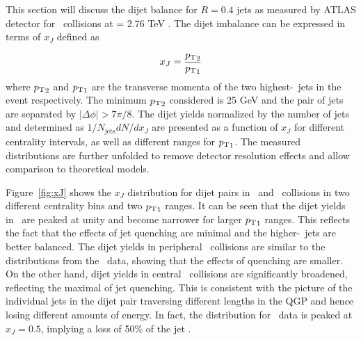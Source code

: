 
This section will discuss the dijet balance for $R = 0.4$ jets as measured by ATLAS detector for \pbpb\ collisions at \sqrtsnn = 2.76 TeV \cite{Aaboud:2017eww}.
The dijet imbalance can be expressed in terms of $x_J$ defined as

\begin{align}
x_J =  \frac{\mbox{$p_{\mathrm{T}}$}_2}{\mbox{$p_{\mathrm{T}}$}_1}
\end{align}
where $\mbox{$p_{\mathrm{T}}$}_2$ and $\mbox{$p_{\mathrm{T}}$}_1$ are the transverse momenta of the two highest-\pt\ jets in the event respectively.
The minimum $\mbox{$p_{\mathrm{T}}$}_2$ considered is 25 GeV and the pair of jets are separated by $|\Delta\phi| > 7\pi/8$.
The dijet yields normalized by the number of jets and determined as $1/N_\mathrm{jets} dN/dx_J$ are presented as a function of $x_J$ for different centrality intervals, as well as different ranges for $\mbox{$p_{\mathrm{T}}$}_1$.
The measured distributions are further unfolded to remove detector resolution effects and allow comparison to theoretical models.

Figure~\ref{fig:xJ} shows the $x_J$ distribution for dijet pairs in \pp\ and \pbpb\ collisions in two different centrality bins and two $\mbox{$p_{\mathrm{T}}$}_1$ ranges.
It can be seen that the dijet yields in \pp\ are peaked at unity and become narrower for larger $\mbox{$p_{\mathrm{T}}$}_1$ ranges.
This reflects the fact that the effects of jet quenching are minimal and the higher-\pt\ jets are better balanced.
The dijet yields in peripheral \pbpb\ collisions are similar to the distributions from the \pp\ data, showing that the effects of quenching are smaller.
On the other hand, dijet yields in central \pbpb\ collisions are significantly broadened, reflecting the maximal  of jet quenching.
This is consistent with the picture of the individual jets in the dijet pair traversing different lengths in the QGP and hence losing different amounts of energy.
In fact, the distribution for \pbpb\ data is peaked at $x_J = 0.5$, implying a loss of 50\% of the jet \pt.

